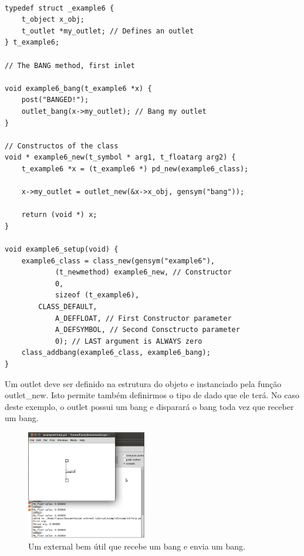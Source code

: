 \documentclass[10pt,a4paper]{report}
\begin{document}
\begin{lstlisting}

typedef struct _example6 {
    t_object x_obj;
    t_outlet *my_outlet; // Defines an outlet
} t_example6;

// The BANG method, first inlet

void example6_bang(t_example6 *x) {
    post("BANGED!");
    outlet_bang(x->my_outlet); // Bang my outlet
}

// Constructos of the class
void * example6_new(t_symbol * arg1, t_floatarg arg2) {
    t_example6 *x = (t_example6 *) pd_new(example6_class);

    x->my_outlet = outlet_new(&x->x_obj, gensym("bang"));

    return (void *) x;
}

void example6_setup(void) {
    example6_class = class_new(gensym("example6"),
            (t_newmethod) example6_new, // Constructor
            0, 
            sizeof (t_example6),
	    CLASS_DEFAULT,
            A_DEFFLOAT, // First Constructor parameter
            A_DEFSYMBOL, // Second Consctructo parameter
            0); // LAST argument is ALWAYS zero
    class_addbang(example6_class, example6_bang);
}
\end{lstlisting}

Um outlet deve ser definido na estrutura do objeto e instanciado pela função outlet\_new. Isto permite também definirmos o tipo de dado que ele terá. No caso deste exemplo, o outlet possui um bang e disparará o bang toda vez que receber um bang.

\begin{figure}[h!]
	\centering
	\includegraphics[height=180]{./images/example6}
	\caption{Um external bem útil que recebe um bang e envia um bang.}
\end{figure}
\end{document}
